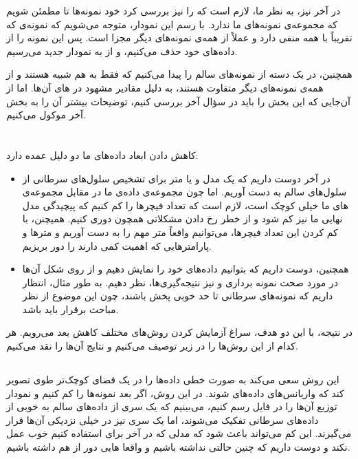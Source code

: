 \documentclass[12pt,onecolumn,a4paper]{article}
\begin{document}
در آخر نیز، به نظر ما، لازم است که  را نیز بررسی کرد خود نمونه‌ها تا مطمئن شویم که مجموعه‌ی نمونه‌های ما  ندارد. با رسم این نمودار، متوجه می‌شویم که نمونه‌ی  که تقریباً با همه  منفی دارد و عملاً از همه‌ی نمونه‌های دیگر مجزا است. پس این نمونه را از داده‌های خود حذف می‌کنیم، و از  به نمودار  جدید  می‌رسیم.

همچنین، در  یک دسته از نمونه‌های سالم را پیدا می‌کنیم که فقط به هم شبیه هستند و از همه‌ی نمونه‌های دیگر متفاوت هستند، به دلیل مقادیر مشهود در های آن‌ها. اما از آن‌جایی که این بخش را باید در سؤال آخر بررسی کنیم، توضیحات بیشتر آن را به بخش آخر موکول می‌کنیم.

\section{}
کاهش دادن ابعاد داده‌های ما دو دلیل عمده دارد:
\begin{itemize}
\item در آخر دوست داریم که یک مدل و یا متر برای تشخیص سلول‌های سرطانی از سلول‌های سالم به دست آوریم. اما چون مجموعه‌ی داده‌ی ما در مقابل مجموعه‌ی های ما خیلی کوچک است، لازم است که تعداد فیچر‌ها را کم کنیم که پیچیدگی مدل نهایی ما نیز کم شود و از خطر رخ دادن مشکلاتی همچون  دوری کنیم. همیچنن، با کم کردن این تعداد فیچر‌ها، می‌توانیم واقعاً متر مهم را به دست آوریم و متر‌ها و پارامتر‌هایی که اهمیت کمی دارند را دور بریزیم.
\item همچنین، دوست داریم که بتوانیم داده‌های خود را نمایش دهیم و از روی شکل آن‌ها در مورد صحت نمونه برداری و نیز نتیجه‌گیری‌ها، نظر دهیم. به طور مثال، انتظار داریم که نمونه‌های سرطانی تا حد خوبی پخش باشند، چون این موضوع از نظر مباحث  برقرار باید باشد.
\end{itemize}

در نتیجه، با این دو هدف، سراغ آزمایش کردن روش‌های مختلف کاهش بعد می‌رویم. هر کدام از این روش‌ها را در زیر توصیف می‌کنیم و نتایج آن‌ها را نقد می‌کنیم.

\subsection{}
این روش سعی می‌کند به صورت خطی داده‌ها را در یک فضای کوچک‌تر طوی تصویر کند که واریانس‌های داده‌های  شوند. در این روش، اگر بعد نمونه‌ها را کم کنیم و نمودار توزیع آن‌ها را در فایل  رسم کنیم، می‌بینیم که یک سری از داده‌های سالم به خوبی از داده‌های سرطانی تفکیک می‌شوند، اما یک سری نیز در خیلی نزدیکی آن‌ها قرار می‌گیرند. این  کم می‌تواند باعث شود که مدلی که در آخر برای  استفاده کنیم خوب عمل نکند و دوست داریم که چنین حالتی نداشته باشیم و واقعا هایی دور از هم داشته باشیم.
\end{document}
